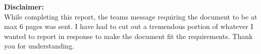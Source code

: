 \documentclass[12pt]{article}
\begin{document}

\textbf{Disclaimer:}\\
While completing this report, the teams message requiring the document to be at max 6 pages was sent. I have had to cut out a tremendous portion of whatever I wanted to report in response to make the document fit the requirements. Thank you for understanding.
\end{document}
